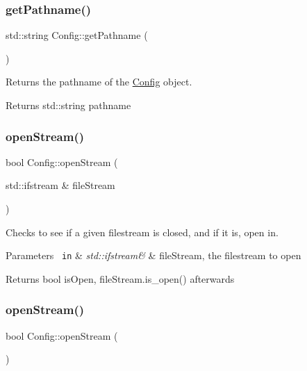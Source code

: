 \subsubsection{\texorpdfstring{getPathname()}{getPathname()}}
{\footnotesize\ttfamily std\+::string Config\+::get\+Pathname (\begin{DoxyParamCaption}{ }\end{DoxyParamCaption})}



Returns the pathname of the \mbox{\hyperlink{classConfig}{Config}} object. 

\begin{DoxyReturn}{Returns}
std\+::string pathname 
\end{DoxyReturn}
\mbox{\label{classConfig_a9075a1a876f161230cf9b97268ac520a}} 
\subsubsection{\texorpdfstring{openStream()}{openStream()}\hspace{0.1cm}{\footnotesize\ttfamily [1/2]}}
{\footnotesize\ttfamily bool Config\+::open\+Stream (\begin{DoxyParamCaption}\item[{std\+::ifstream \&}]{file\+Stream }\end{DoxyParamCaption})}



Checks to see if a given filestream is closed, and if it is, open in. 


\begin{DoxyParams}[1]{Parameters}
\mbox{\texttt{ in}}  & {\em std\+::ifstream\&} & file\+Stream, the filestream to open\\
\hline
\end{DoxyParams}
\begin{DoxyReturn}{Returns}
bool is\+Open, file\+Stream.\+is\+\_\+open() afterwards 
\end{DoxyReturn}
\mbox{\label{classConfig_a96dde912b89cf8954cad1e472527cb2e}} 
\subsubsection{\texorpdfstring{openStream()}{openStream()}\hspace{0.1cm}{\footnotesize\ttfamily [2/2]}}
{\footnotesize\ttfamily bool Config\+::open\+Stream (\begin{DoxyParamCaption}{ }\end{DoxyParamCaption})}




